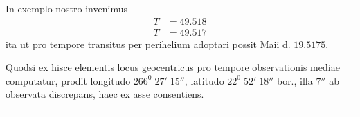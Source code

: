 In exemplo nostro invenimus
\[
\begin{aligned}
T&=49.518\\
T&=49.517
\end{aligned}
\]
ita ut pro tempore transitus per perihelium adoptari possit Maii d. $19.5175$.

Quodsi ex hisce elementis locus geocentricus pro tempore observationis mediae computatur, prodit longitudo $266^0\;27'\;15''$, latitudo $22^0\;52'\;18''$ bor., illa $7''$ ab observata discrepans, haec ex asse consentiens.
\par\medskip\begin{center}\rule{.25\linewidth}{.3pt}\end{center}
